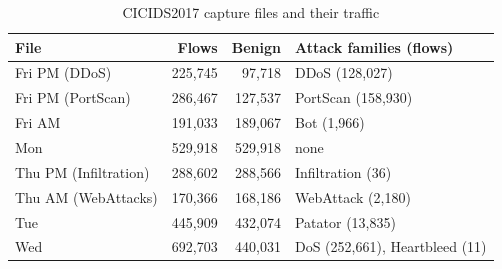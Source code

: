 \begin{table}[!htbp]
\centering
\caption{CICIDS2017 capture files and their traffic}
\label{tab:files}
\footnotesize
\begin{tabular}{@{}lrrp{6.2cm}@{}}
\toprule
\textbf{File} & \textbf{Flows} & \textbf{Benign} & \textbf{Attack families (flows)} \\
\midrule
Fri PM (DDoS) & 225,745 & 97,718 & DDoS (128,027) \\
Fri PM (PortScan) & 286,467 & 127,537 & PortScan (158,930) \\
Fri AM & 191,033 & 189,067 & Bot (1,966) \\
Mon & 529,918 & 529,918 & none \\
Thu PM (Infiltration) & 288,602 & 288,566 & Infiltration (36) \\
Thu AM (WebAttacks) & 170,366 & 168,186 & WebAttack (2,180) \\
Tue & 445,909 & 432,074 & Patator (13,835) \\
Wed & 692,703 & 440,031 & DoS (252,661), Heartbleed (11) \\
\bottomrule
\end{tabular}
\end{table}

